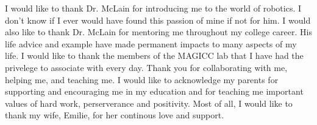 \afterpage{\cleardoublepage}
%
I would like to thank Dr. McLain for introducing me to the world of robotics. I
don't know if I ever would have found this passion of mine if not for him. I would also
like to thank Dr. McLain for mentoring me throughout my college career. His life
advice and example have made permanent impacts to many
aspects of my life. I would like to thank the members of the MAGICC lab that I
have had the privelege to associate with every day. Thank you for collaborating
with me, helping me, and teaching me. I would like to acknowledge my parents for supporting and
encouraging me in my education and for teaching me important values of hard
work, perserverance and positivity. Most of all, I would like to thank my wife, Emilie, for
her continous love and support.
